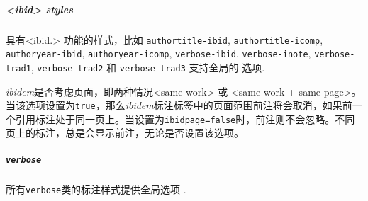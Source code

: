 
\subparagraph{<ibid> styles} 具有<ibid.> 功能的样式，比如 \texttt{authortitle-ibid}, \texttt{author\allowbreakhere title-icomp}, \texttt{author\allowbreakhere year-ibid}, \texttt{authoryear-icomp}, \texttt{ver\allowbreakhere bose-ibid}, \texttt{verbose-inote}, \texttt{verbose-trad1}, \texttt{verbose-trad2} 和 \texttt{verbose-trad3} 支持全局的 选项.

\begin{optionlist}



\emph{ibidem}是否考虑页面，即两种情况<same work> 或 <same work + same page>。当该选项设置为\texttt{true}，那么\emph{ibidem}标注标签中的页面范围前注将会取消，如果前一个引用标注处于同一页上。当设置为\texttt{ibidpage=false}时，前注则不会忽略。不同页上的标注，总是会显示前注，无论是否设置该选项。


\end{optionlist}


\subparagraph{\texttt{verbose}} 所有\texttt{verbose}类的标注样式提供全局选项 .

